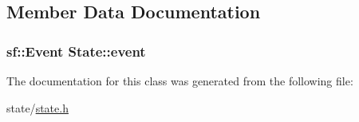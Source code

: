 \subsection{Member Data Documentation}
\subsubsection[{\texorpdfstring{event}{event}}]{\setlength{\rightskip}{0pt plus 5cm}sf\+::\+Event State\+::event}\hypertarget{classState_a6e01842c2b93b36eba5d1153aa6ae952}{}\label{classState_a6e01842c2b93b36eba5d1153aa6ae952}


The documentation for this class was generated from the following file\+:\begin{DoxyCompactItemize}
\item 
state/\hyperlink{state_8h}{state.\+h}\end{DoxyCompactItemize}
